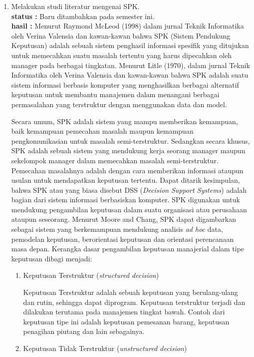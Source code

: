 \documentclass[a4paper,twoside]{article}
\begin{document}
\begin{enumerate}
				
		
		\item Melakukan studi literatur mengenai SPK.\\
		{\bf status :} Baru ditambahkan pada semester ini.\\
		{\bf hasil :} Menurut Raymond McLeod (1998) dalam jurnal Teknik Informatika oleh Verina Valensia dan kawan-kawan bahwa SPK (Sistem Pendukung Keputusan) adalah sebuah sistem penghasil informasi spesifik yang ditujukan untuk memecahkan suatu masalah tertentu yang harus dipecahkan oleh manager pada berbagai tingkatan. Menurut Litle (1970), dalam jurnal Teknik Informatika oleh Verina Valensia dan kawan-kawan bahwa SPK adalah suatu sistem informasi berbasis komputer yang menghasilkan berbagai alternatif keputusan untuk membantu manajemen dalam menangani berbagai permasalahan yang terstruktur dengan menggunakan data dan model. 

Secara umum, SPK adalah sistem yang mampu memberikan kemampuan, baik kemampuan pemecahan masalah maupun kemampuan pengkomunikasian untuk masalah semi-terstruktur. Sedangkan secara khusus, SPK adalah sebuah sistem yang mendukung kerja seorang manager maupun sekelompok manager dalam memecahkan masalah semi-terstruktur. Pemecahan masalahnya adalah dengan cara memberikan informasi ataupun usulan untuk mendapatkan keputusan tertentu. Dapat ditarik kesimpulan, bahwa SPK atau yang biasa disebut DSS (\textit{Decision Support Systems}) adalah bagian dari sistem informasi berbasiskan komputer. SPK digunakan untuk mendukung pengambilan keputusan dalam suatu organisasi atau perusahaan ataupun seseorang. Menurut Moore and Chang, SPK dapat digambarkan sebagai sistem yang berkemampuan mendukung analisis \textit{ad hoc} data, pemodelan keputusan, berorientasi keputusan dan orientasi perencanaan masa depan. Kerangka dasar pengambilan keputusan manajerial dalam tipe keputusan dibagi menjadi:	
	\begin{enumerate}
		\item Keputusan Terstruktur (\textit{structured decision})
		
		Keputusan Terstruktur adalah sebuah keputusan yang berulang-ulang dan rutin, sehingga dapat diprogram. Keputusan terstruktur terjadi dan dilakukan terutama pada manajemen tingkat bawah. Contoh dari keputusan tipe ini adalah keputusan pemesanan barang, keputusan penagihan piutang dan lain sebagainya.
		
		\item Keputusan Tidak Terstruktur (\textit{unstructured decision})
		

\end{enumerate}
\end{enumerate}
\end{document}
